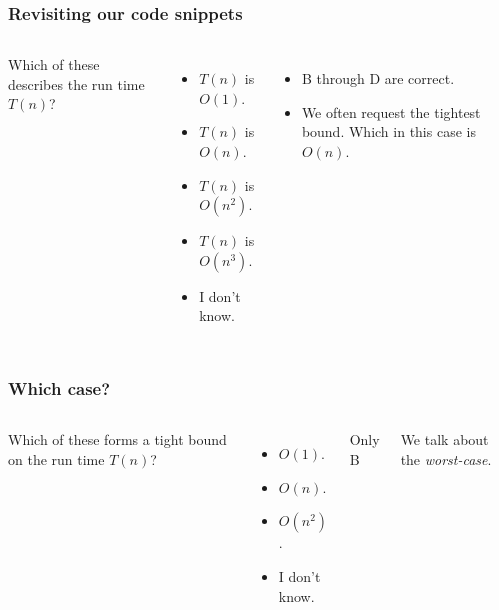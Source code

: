\begin{frame}
	\frametitle{Revisiting our code snippets}
	
	
	\begin{columns}
		Which of these describes the run time $T(n)$?
	\begin{itemize}
		\item $T(n)$ is $O(1)$.
		\item $T(n)$ is $O(n)$. 
		\item $T(n)$ is $O(n^2)$. 
		\item $T(n)$ is $O(n^3)$. 
		\item I don't know.
	\end{itemize}	
	\begin{itemize}
		\item B through D are correct.
		\item We often request the tightest bound. Which in this case is $O(n)$.
	\end{itemize}	
		
	\end{columns}

	

	
\end{frame}

\begin{frame}
	\frametitle{Which case?}
	
	\begin{columns}
		\column{0.755\linewidth}

		Which of these forms a tight bound on the run time $T(n)$?
		
	\begin{itemize}
		\item $O(1)$. 
		\item $O(n)$. 
		\item $O(n^2)$. 
		\item I don't know.
	\end{itemize}	
		\column{0.255\linewidth}
		
			Only B
		
				We talk about the \textit{worst-case}.
	\end{columns}
	
	
	
\end{frame}

